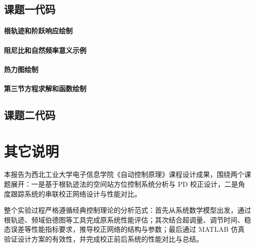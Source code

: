 \documentclass[a4paper]{ctexbook}
\begin{document}
\section{课题一代码}
\subsubsection{根轨迹和阶跃响应绘制}

\subsubsection{阻尼比和自然频率意义示例}

\subsubsection{热力图绘制}

\subsubsection{第三节方程求解和函数绘制}

\section{课题二代码}

\backmatter
\chapter{其它说明}

本报告为西北工业大学电子信息学院《自动控制原理》课程设计成果，围绕两个课题展开：一是基于根轨迹法的空间站方位控制系统分析与 PD 校正设计，二是角度跟踪系统的串联校正网络设计与性能对比。

整个实验过程严格遵循经典控制理论的分析范式：首先从系统数学模型出发，通过根轨迹、频域伯德图等工具完成原系统性能评估；其次结合超调量、调节时间、稳态误差等性能指标要求，推导校正网络的结构与参数；最后通过 MATLAB 仿真验证设计方案的有效性，并完成校正前后系统的性能对比与总结。
\end{document}

